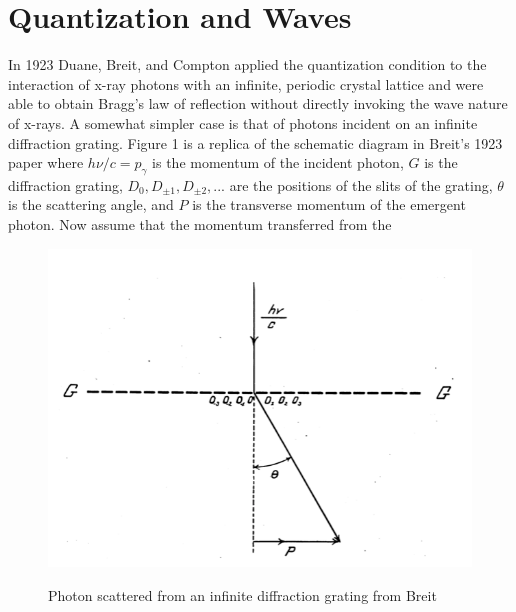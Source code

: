 \documentclass[12pt]{article}
\begin{document}
\section{Quantization and Waves}\label{QandW}

In 1923 Duane\cite{Du1923}, Breit\cite{Br1923}, and Compton\cite{Co1923} applied the quantization condition to the interaction of x-ray photons with an infinite, periodic crystal lattice and were able to obtain Bragg's law of reflection without directly invoking the wave nature of x-rays.  A somewhat simpler case is that of photons incident on an infinite diffraction grating.  Figure 1 is a replica of the schematic diagram in Breit's 1923 paper where $h\nu/c =p_{\gamma}$
is the momentum of the incident photon, $G$ is the diffraction grating, $D_{0},D_{\pm1},D_{\pm2},...$ are the positions of the slits of the grating, $\theta$ is the scattering angle, and $P$ is the transverse momentum of the emergent photon. Now assume that the momentum transferred from the
\begin{figure}[htb]
\vbox{\hfil\scalebox{1.0}
{\includegraphics{Breit.pdf}}\hfil}
{\caption{\footnotesize{Photon scattered from an infinite diffraction grating from Breit\cite{Br1923}}}}
\end{figure}
\end{document}
